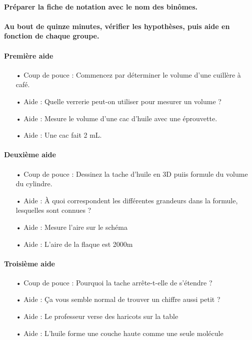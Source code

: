 \documentclass[12pt,a4paper]{article}
\begin{document}
\paragraph{Préparer la fiche de notation avec le nom des binômes.}

\paragraph{Au bout de quinze minutes, vérifier les hypothèses, puis aide en fonction de chaque groupe.}

\paragraph{Première aide}
\begin{itemize}
\item[•] Coup de pouce : Commencez par déterminer le volume d'une cuillère à café.
\item[•] Aide : Quelle verrerie peut-on utiliser pour mesurer un volume ?
\item[•] Aide : Mesure le volume d'une cac d'huile avec une éprouvette.
\item[•] Aide : Une cac fait 2 mL.
\end{itemize}

\paragraph{Deuxième aide}
\begin{itemize}
\item[•] Coup de pouce : Dessinez la tache d'huile en 3D puiis formule du volume du cylindre.
\item[•] Aide : À quoi correspondent les différentes grandeurs dans la formule, lesquelles sont connues ?
\item[•] Aide : Mesure l'aire sur le schéma
\item[•] Aide : L'aire de la flaque est \unit{2000}{m\squared}
\end{itemize}

\paragraph{Troisième aide}
\begin{itemize}
\item[•] Coup de pouce : Pourquoi la tache arrête-t-elle de s'étendre ?
\item[•] Aide : Ça vous semble normal de trouver un chiffre aussi petit ?
\item[•] Aide : Le professeur verse des haricots sur la table
\item[•] Aide : L'huile forme une couche haute comme une seule molécule
\end{itemize}
\end{document}
